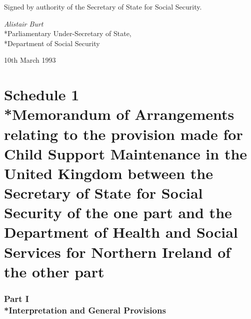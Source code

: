 \documentclass[12pt,a4paper]{article}
\begin{document}
\bigskip

Signed by authority of the Secretary of State for Social Security.

{\raggedleft
\emph{Alistair Burt}\\*Parliamentary Under-Secretary of State,\\*Department of Social Security

}

10th March 1993

\small

\part[Schedule 1 --- Memorandum of Arrangements relating to the provision made for Child Support Maintenance in the United Kingdom between the Secretary of State for Social Security of the one part and the Department of Health and Social Services for Northern Ireland of the other part]{Schedule 1\\*Memorandum of Arrangements relating to the provision made for Child Support Maintenance in the United Kingdom between the Secretary of State for Social Security of the one part and the Department of Health and Social Services for Northern Ireland of the other part}

\section[Part I --- Interpretation and General Provisions]{Part I\\*Interpretation and General Provisions}

\renewcommand\parthead{--- Schedule 1 Part I}
\end{document}
